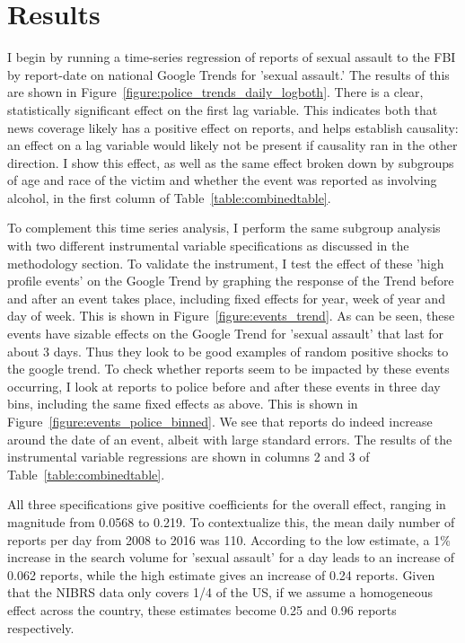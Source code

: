 \documentclass[AER,draftmode]{AEA}
\begin{document}
\section{Results}

I begin by running a time-series regression of reports of sexual assault to the FBI by report-date on national Google Trends for 'sexual assault.' The results of this are shown in Figure~\ref{figure:police_trends_daily_logboth}. There is a clear, statistically significant effect on the first lag variable. This indicates both that news coverage likely has a positive effect on reports, and helps establish causality: an effect on a lag variable would likely not be present if causality ran in the other direction. I show this effect, as well as the same effect broken down by subgroups of age and race of the victim and whether the event was reported as involving alcohol, in the first column of Table~\ref{table:combinedtable}. 

To complement this time series analysis, I perform the same subgroup analysis with two different instrumental variable specifications as discussed in the methodology section. To validate the instrument, I test the effect of these 'high profile events' on the Google Trend by graphing the response of the Trend before and after an event takes place, including fixed effects for year, week of year and day of week. This is shown in Figure~\ref{figure:events_trend}. As can be seen, these events have sizable effects on the Google Trend for 'sexual assault' that last for about 3 days. Thus they look to be good examples of random positive shocks to the google trend. To check whether reports seem to be impacted by these events occurring, I look at reports to police before and after these events in three day bins, including the same fixed effects as above. This is shown in Figure~\ref{figure:events_police_binned}. We see that reports do indeed increase around the date of an event, albeit with large standard errors.  The results of the instrumental variable regressions are shown in columns 2 and 3 of Table~\ref{table:combinedtable}. 

All three specifications give positive coefficients for the overall effect, ranging in magnitude from 0.0568 to 0.219. To contextualize this, the mean daily number of reports per day from 2008 to 2016 was 110. According to the low estimate, a 1\% increase in the search volume for 'sexual assault' for a day leads to an increase of 0.062 reports, while the high estimate gives an increase of 0.24 reports. Given that the NIBRS data only covers 1/4 of the US, if we assume a homogeneous effect across the country, these estimates become 0.25 and 0.96 reports respectively.
\end{document}
